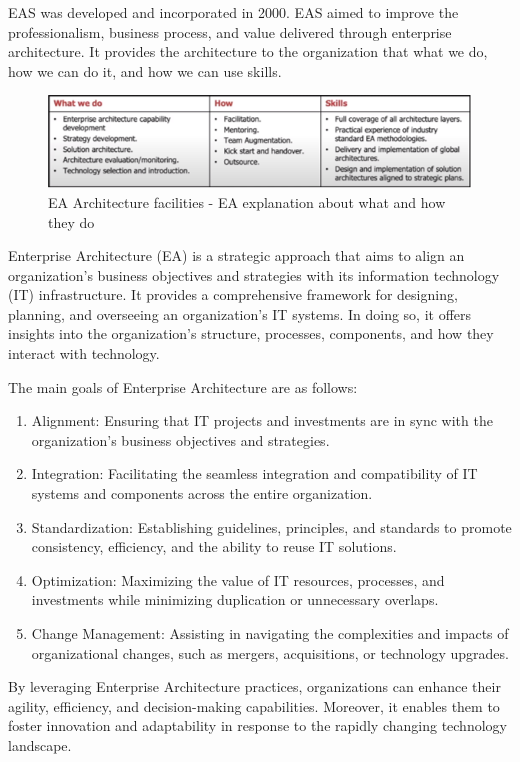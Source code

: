 \documentclass{article}
\begin{document}
EAS was developed and incorporated in 2000. EAS aimed to improve the professionalism, business process, and value delivered through enterprise architecture. It provides the architecture to the organization that what we do, how we can do it, and how we can use skills. 

\begin{figure}[ht!]
    \centering
    \includegraphics[scale=0.8]{ea-what-how-skills}
    \caption{EA Architecture facilities - 
EA explanation about what and how they do}
    \label{fig:ea-facilities}
\end{figure}

Enterprise Architecture (EA) is a strategic approach that aims to align an organization's business objectives and strategies with its information technology (IT) infrastructure. It provides a comprehensive framework for designing, planning, and overseeing an organization's IT systems. In doing so, it offers insights into the organization's structure, processes, components, and how they interact with technology.

The main goals of Enterprise Architecture are as follows:
\begin{enumerate}
    \item Alignment: Ensuring that IT projects and investments are in sync with the organization's business objectives and strategies.
    \item Integration: Facilitating the seamless integration and compatibility of IT systems and components across the entire organization.
    \item Standardization: Establishing guidelines, principles, and standards to promote consistency, efficiency, and the ability to reuse IT solutions.
    \item Optimization: Maximizing the value of IT resources, processes, and investments while minimizing duplication or unnecessary overlaps.
    \item Change Management: Assisting in navigating the complexities and impacts of organizational changes, such as mergers, acquisitions, or technology upgrades.
\end{enumerate}

By leveraging Enterprise Architecture practices, organizations can enhance their agility, efficiency, and decision-making capabilities. Moreover, it enables them to foster innovation and adaptability in response to the rapidly changing technology landscape.
\end{document}
